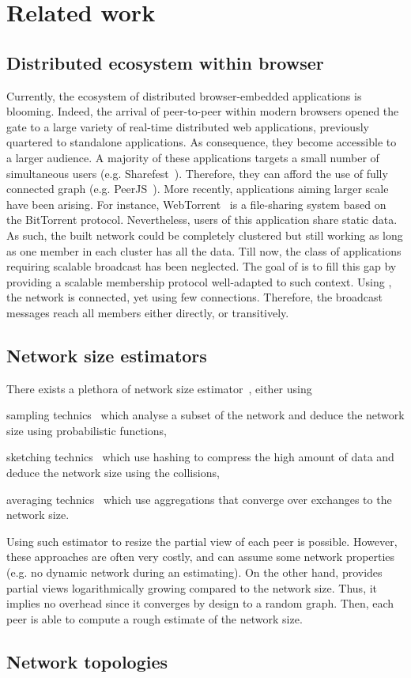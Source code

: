 
\section{Related work}
\label{sec:relatedwork}

\subsection{Distributed ecosystem within browser}
Currently, the ecosystem of distributed browser-embedded applications is
blooming. Indeed, the arrival of peer-to-peer within modern browsers opened the
gate to a large variety of real-time distributed web applications, previously
quartered to standalone applications. As consequence, they become accessible to
a larger audience. A majority of these applications targets a small number of
simultaneous users (e.g. Sharefest~\cite{sharefest}). Therefore, they can
afford the use of fully connected graph (e.g. PeerJS~\cite{peerjs}). More
recently, applications aiming larger scale have been arising. For instance,
WebTorrent~\cite{webtorrent} is a file-sharing system based on the BitTorrent
protocol. Nevertheless, users of this application share static data. As such,
the built network could be completely clustered but still working as long as
one member in each cluster has all the data.  Till now, the class of
applications requiring scalable broadcast has been neglected. The goal of
\SCAMPLON{} is to fill this gap by providing a scalable membership protocol
well-adapted to such context. Using \SCAMPLON{}, the network is connected, yet
using few connections. Therefore, the broadcast messages reach all members
either directly, or transitively.


\subsection{Network size estimators}
There exists a plethora of network size
estimator~\cite{kostoulas2007active,baquero2012extrema}, either using
\begin{inparaenum}[(i)]
\item sampling technics~\cite{ganesh2007peer,kostoulas2007active} which analyse
  a subset of the network and deduce the network size using probabilistic
  functions,
\item sketching technics~\cite{baquero2012extrema} which use hashing to
  compress the high amount of data and deduce the network size using the
  collisions,
\item averaging technics~\cite{jelasity2004epidemic} which use aggregations
  that converge over exchanges to the network size.
\end{inparaenum}
Using such estimator to resize the partial view of each peer is
possible. However, these approaches are often very costly, and can assume some
network properties (e.g. no dynamic network during an estimating). On the other
hand, \SCAMPLON{} provides partial views logarithmically growing compared to
the network size. Thus, it implies no overhead since it converges by design to
a random graph. Then, each peer is able to compute a rough estimate of the
network size.

\subsection{Network topologies}

